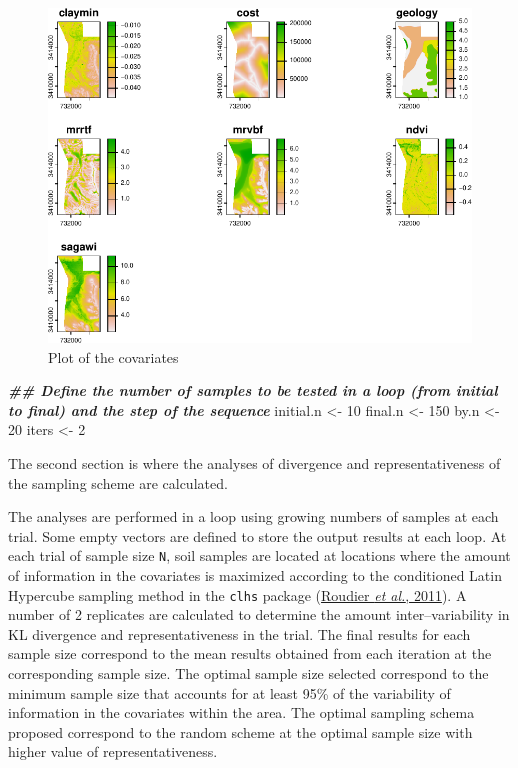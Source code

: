 \documentclass[
  10pt,
  b5paper,
  oneside]{book}
\newenvironment{Shaded}{\begin{snugshade}}{\end{snugshade}}
\newcommand{\DecValTok}[1]{\textcolor[rgb]{0.00,0.00,0.81}{#1}}
\newcommand{\DocumentationTok}[1]{\textcolor[rgb]{0.56,0.35,0.01}{\textbf{\textit{#1}}}}
\newcommand{\NormalTok}[1]{#1}
\newcommand{\OtherTok}[1]{\textcolor[rgb]{0.56,0.35,0.01}{#1}}
\begin{document}
\begin{figure}
\centering
\includegraphics{Technical-Manual-Soil-Sampling-Design_files/figure-latex/fig-5-1.pdf}
\caption{\label{fig:fig-5}Plot of the covariates}
\end{figure}

\begin{Shaded}
\begin{Highlighting}[]
  \DocumentationTok{\#\# Define the number of samples to be tested in a loop (from initial to final) and the step of the sequence}
\NormalTok{  initial.n }\OtherTok{\textless{}{-}} \DecValTok{10}
\NormalTok{  final.n }\OtherTok{\textless{}{-}} \DecValTok{150}
\NormalTok{  by.n }\OtherTok{\textless{}{-}} \DecValTok{20}
\NormalTok{  iters }\OtherTok{\textless{}{-}} \DecValTok{2}
\end{Highlighting}
\end{Shaded}

The second section is where the analyses of divergence and representativeness of the sampling scheme are calculated.

The analyses are performed in a loop using growing numbers of samples at each trial. Some empty vectors are defined to store the output results at each loop. At each trial of sample size \texttt{\textquotesingle{}N\textquotesingle{}}, soil samples are located at locations where the amount of information in the covariates is maximized according to the conditioned Latin Hypercube sampling method in the \texttt{\textquotesingle{}clhs\textquotesingle{}} package (\protect\hyperlink{ref-Roudier2011}{Roudier \emph{et al.}, 2011}). A number of 2 replicates are calculated to determine the amount inter--variability in KL divergence and representativeness in the trial. The final results for each sample size correspond to the mean results obtained from each iteration at the corresponding sample size. The optimal sample size selected correspond to the minimum sample size that accounts for at least 95\% of the variability of information in the covariates within the area. The optimal sampling schema proposed correspond to the random scheme at the optimal sample size with higher value of representativeness.
\end{document}

